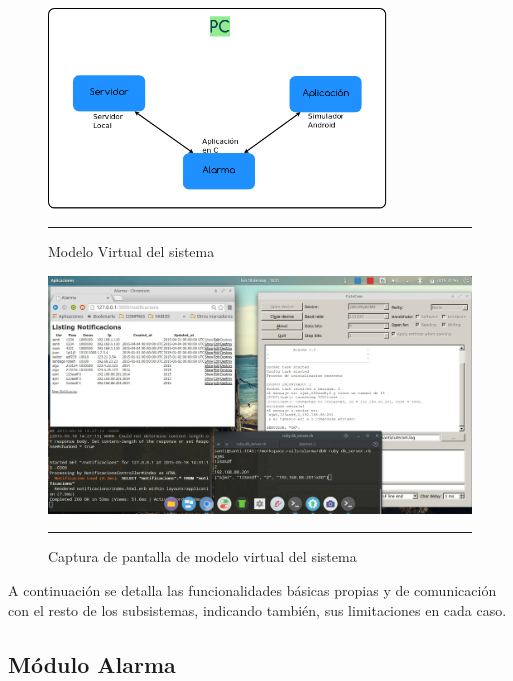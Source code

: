 \begin{figure}[htbp]
	\centering
		\includegraphics[width=0.8\textwidth]{Figures/Diagrama_virtual.png}
		\rule{35em}{1.5pt}
	\caption[Modelo Virtual del sistema]{Modelo Virtual del sistema}
\label{Diagrama_virtual}
\end{figure}

\begin{figure}[htbp]
	\centering
		\includegraphics[width=1\textwidth]{Figures/captura_virtual.png}
		\rule{35em}{1.5pt}
	\caption[Captura de pantalla de modelo virtual del sistema]{Captura de pantalla de modelo virtual del sistema}

\end{figure}

A continuación se detalla las funcionalidades básicas propias y de comunicación con el resto de los subsistemas, indicando también, sus limitaciones en cada caso.

\newpage


	\subsection{Módulo Alarma}


